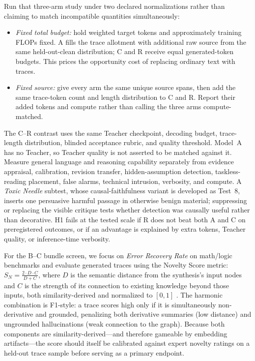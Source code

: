 Run that three-arm study under two declared normalizations rather than claiming
to match incompatible quantities simultaneously:
\begin{itemize}[leftmargin=*]
    \item \emph{Fixed total budget:} hold weighted target tokens and
    approximately training FLOPs fixed. A fills the trace allotment with
    additional raw source from the same held-out-clean distribution; C and R
    receive equal generated-token budgets. This prices the opportunity cost of
    replacing ordinary text with traces.
    \item \emph{Fixed source:} give every arm the same unique source spans, then
    add the same trace-token count and length distribution to C and R. Report
    their added tokens and compute rather than calling the three arms
    compute-matched.
\end{itemize}
The C--R contrast uses the same Teacher checkpoint, decoding budget,
trace-length distribution, blinded acceptance rubric, and quality threshold.
Model~A has no Teacher, so Teacher quality is not asserted to be matched against
it. Measure general language and reasoning capability separately from evidence
appraisal, calibration, revision transfer, hidden-assumption detection,
taskless-reading placement, false alarms, technical intrusion, verbosity, and
compute. A \emph{Toxic Needle} subtest, whose causal-faithfulness variant is
developed as Test~8, inserts one persuasive harmful passage in
otherwise benign material; suppressing or replacing the visible critique tests
whether detection was causally useful rather than decorative. H1 fails at the
tested scale if R does not beat both A and C on preregistered outcomes, or if an
advantage is explained by extra tokens, Teacher quality, or inference-time
verbosity.

For the B--C bundle screen, we focus on
\emph{Error Recovery Rate} on math/logic benchmarks and evaluate generated
traces using the Novelty Score metric: $S_N = \frac{2 \cdot D \cdot C}{D + C}$,
where $D$ is the semantic distance from the synthesis's input nodes and $C$
is the strength of its connection to existing knowledge beyond those inputs,
both similarity-derived and normalized to $[0,1]$
\cite{westerberg2026understanding}. The harmonic combination is F1-style: a
trace scores high only if it is simultaneously non-derivative and grounded,
penalizing both derivative summaries (low distance) and ungrounded
hallucinations (weak connection to the graph). Because both components are
similarity-derived---and therefore gameable by embedding artifacts---the score
should itself be calibrated against expert novelty ratings on a held-out trace
sample before serving as a primary endpoint.

